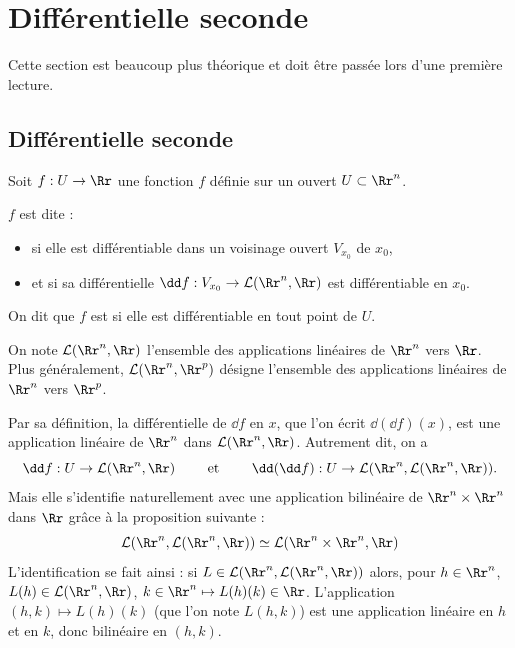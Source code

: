 \documentclass[11pt, class=report,crop=false]{standalone}
\begin{document}
\section{Différentielle seconde}

Cette section est beaucoup plus théorique et doit être passée lors d'une première lecture.

\subsection{Différentielle seconde}


Soit $f : U \to \Rr$ une fonction $f$ définie sur un ouvert $U \subset \Rr^n$.
\begin{definition}
$f$ est dite  :
    \begin{itemize}
        \item si elle est différentiable dans un voisinage ouvert $V_{x_0}$ de $x_0$,
        \item et si sa différentielle $\dd f : V_{x_0} \to \mathcal{L}(\Rr^n,\Rr)$ est différentiable en $x_0$.
    \end{itemize}
    On dit que $f$ est  si elle est différentiable en tout point de $U$.
\end{definition} 


On note $\mathcal{L}(\Rr^n,\Rr)$ l'ensemble des applications linéaires de $\Rr^n$ vers $\Rr$.
Plus généralement, $\mathcal{L}(\Rr^n,\Rr^p)$ désigne l'ensemble des applications linéaires de $\Rr^n$ vers $\Rr^p$.

Par sa définition, la différentielle de $\dd f$ en $x$, que l'on écrit $\dd(\dd f)(x)$, est une application linéaire de $\Rr^n$ dans $\mathcal{L}(\Rr^n,\Rr)$. Autrement dit, on a
$$
\dd f : U \to \mathcal{L}(\Rr^n,\Rr) 
\qquad \text{ et } \qquad
\dd (\dd f) : U \to \mathcal{L} (\Rr^n,\mathcal{L}(\Rr^n,\Rr)).
$$
Mais elle s'identifie naturellement avec une application 
bilinéaire de $\Rr^n \times \Rr^n$ dans $\Rr$ grâce à la proposition suivante :
$$\mathcal{L} (\Rr^n,\mathcal{L}(\Rr^n,\Rr)) \simeq 
\mathcal{L} (\Rr^n \times \Rr^n,\Rr)$$
L'identification se fait ainsi : 
si $L \in \mathcal{L} (\Rr^n,\mathcal{L}(\Rr^n,\Rr))$
alors, pour $h \in \Rr^n$, $L(h) \in \mathcal{L}(\Rr^n,\Rr)$, $k \in \Rr^n \mapsto L(h)(k) \in \Rr$.
L'application $(h,k) \mapsto L(h)(k)$ (que l'on note $L(h,k)$) est une application linéaire en $h$ et en $k$, donc bilinéaire en $(h,k)$.
\end{document}
